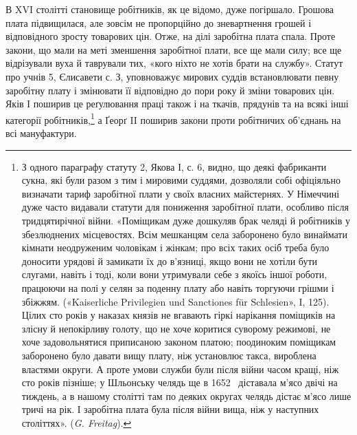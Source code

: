 В XVI столітті становище робітників, як це відомо, дуже
погіршало. Грошова плата підвищилася, але зовсім не пропорційно
до зневартнення грошей і відповідного зросту товарових цін.
Отже, на ділі заробітна плата спала. Проте закони, що мали на
меті зменшення заробітної плати, все ще мали силу; все ще відрізували
вуха й таврували тих, «кого ніхто не хотів брати на
службу». Статут про учнів 5, Єлисавети с. З, уповноважує мирових
суддів встановлювати певну заробітну плату і змінювати
її відповідно до пори року й зміни товарових цін. Яків І поширив
це реґулювання праці також і на ткачів, прядунів та на всякі
інші категорії робітників,\footnote{
З одного параграфу статуту 2, Якова І, с. 6, видно, що деякі
фабриканти сукна, які були разом з тим і мировими суддями, дозволяли
собі офіціяльно визначати тариф заробітної плати у своїх власних майстернях.
У Німеччині дуже часто видавали статути для пониження
заробітної плати, особливо після тридцятирічної війни. «Поміщикам
дуже дошкуляв брак челяді й робітників у збезлюднених місцевостях.
Всім мешканцям села заборонено було винаймати кімнати неодруженим
чоловікам і жінкам; про всіх таких осіб треба було доносити урядові
й замикати їх до в’язниці, якщо вони не хотіли бути слугами, навіть
і тоді, коли вони утримували себе з якоїсь іншої роботи, працюючи на
полі у селян за поденну плату або навіть торгуючи грішми і збіжжям.
(«Kaiserliche Privilegien und Sanctiones für Schlesien», I, 125). Цілих
сто років у наказах князів не вгавають гіркі нарікання поміщиків на
злісну й непокірливу голоту, що не хоче коритися суворому режимові,
не хоче задовольнятися приписаною законом платою; поодиноким поміщикам
заборонено було давати вищу плату, ніж установлює такса, вироблена
властями округи. А проте умови служби були після війни
часом кращі, ніж сто років пізніше; у Шльонську челядь ще в 1652~
діставала м’ясо двічі на тиждень, а в нашому столітті там по деяких
округах челядь дістає м’ясо лише тричі на рік. І заробітна плата була
після війни вища, ніж у наступних століттях». (\emph{G. Freitag}).}
а Ґеорґ II поширив закони проти
робітничих об’єднань на всі мануфактури.

